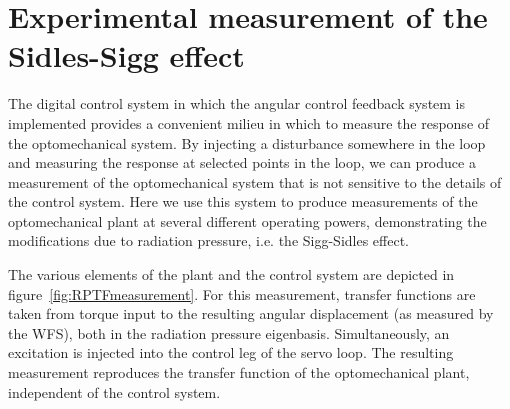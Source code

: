 




\section{Experimental measurement of the Sidles-Sigg effect}

The digital control system in which the angular control feedback
system is implemented provides a convenient milieu in which to measure
the response of the optomechanical system.  By injecting a disturbance
somewhere in the loop and measuring the response at selected points in
the loop, we can produce a measurement of the optomechanical system
that is not sensitive to the details of the control system.   Here we
use this system to produce measurements of the optomechanical plant at
several different operating powers, demonstrating the modifications due
to radiation pressure, i.e. the Sigg-Sidles effect.

The various elements of the plant and the control system are depicted
in figure~\ref{fig:RPTFmeasurement}.  For this measurement, transfer
functions are taken from torque input to the resulting angular
displacement (as measured by the WFS), both in the radiation pressure
eigenbasis.  Simultaneously, an excitation is injected into the
control leg of the servo loop.  The resulting measurement reproduces
the transfer function of the optomechanical plant, independent of the
control system.


